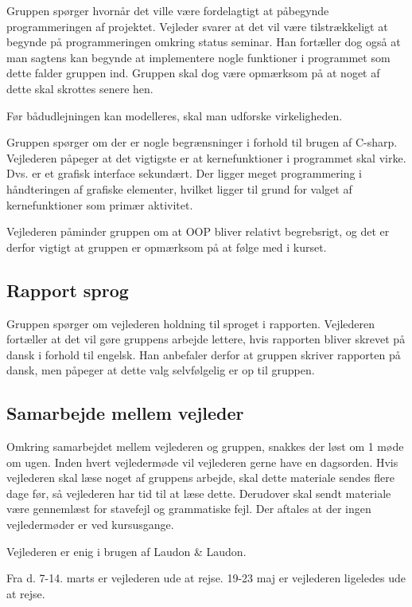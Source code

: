 \documentclass{article}
\begin{document}
Gruppen spørger hvornår det ville være fordelagtigt at påbegynde programmeringen af projektet. Vejleder svarer at det vil være tilstrækkeligt at begynde på programmeringen omkring status seminar. Han fortæller dog også at man sagtens kan begynde at implementere nogle funktioner i programmet som dette falder gruppen ind. Gruppen skal dog være opmærksom på at noget af dette skal skrottes senere hen.

Før bådudlejningen kan modelleres, skal man udforske virkeligheden.

Gruppen spørger om der er nogle begrænsninger i forhold til brugen af C-sharp. Vejlederen påpeger at det vigtigste er at kernefunktioner i programmet skal virke. Dvs. er et grafisk interface sekundært. Der ligger meget programmering i håndteringen af grafiske elementer, hvilket ligger til grund for valget af kernefunktioner som primær aktivitet.

Vejlederen påminder gruppen om at OOP bliver relativt begrebsrigt, og det er derfor vigtigt at gruppen er opmærksom på at følge med i kurset.

\subsection{Rapport sprog}

Gruppen spørger om vejlederen holdning til sproget i rapporten. Vejlederen fortæller at det vil gøre gruppens arbejde lettere, hvis rapporten bliver skrevet på dansk i forhold til engelsk. Han anbefaler derfor at gruppen skriver rapporten på dansk, men påpeger at dette valg selvfølgelig er op til gruppen.


\subsection{Samarbejde mellem vejleder}

Omkring samarbejdet mellem vejlederen og gruppen, snakkes der løst om 1 møde om ugen. Inden hvert vejledermøde vil vejlederen gerne have en dagsorden. Hvis vejlederen skal læse noget af gruppens arbejde, skal dette materiale sendes flere dage før, så vejlederen har tid til at læse dette. Derudover skal sendt materiale være gennemlæst for stavefejl og grammatiske fejl. Der aftales at der ingen vejledermøder er ved kursusgange. 





Vejlederen er enig i brugen af Laudon \& Laudon.

Fra d. 7-14. marts er vejlederen ude at rejse. 19-23 maj er vejlederen ligeledes ude at rejse.
\end{document}
